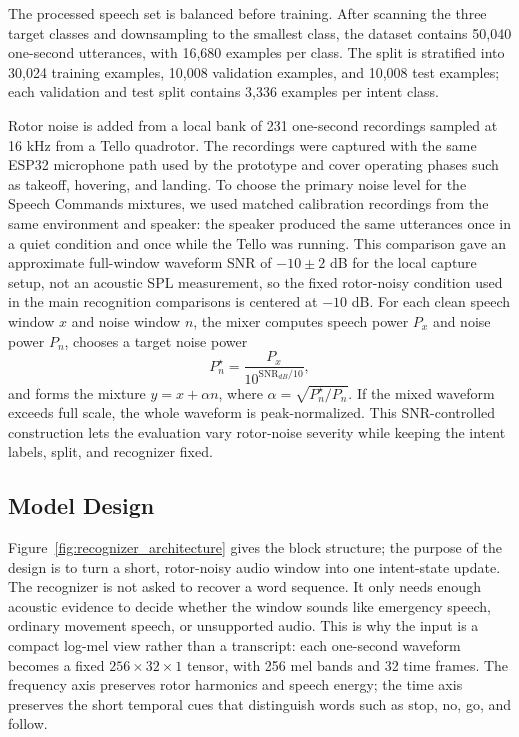 The processed speech set is balanced before training. After scanning the three target classes and downsampling to the smallest class, the dataset contains 50,040 one-second utterances, with 16,680 examples per class. The split is stratified into 30,024 training examples, 10,008 validation examples, and 10,008 test examples; each validation and test split contains 3,336 examples per intent class.

Rotor noise is added from a local bank of 231 one-second recordings sampled at 16 kHz from a Tello quadrotor. The recordings were captured with the same ESP32 microphone path used by the prototype and cover operating phases such as takeoff, hovering, and landing. To choose the primary noise level for the Speech Commands mixtures, we used matched calibration recordings from the same environment and speaker: the speaker produced the same utterances once in a quiet condition and once while the Tello was running. This comparison gave an approximate full-window waveform SNR of \(-10 \pm 2\) dB for the local capture setup, not an acoustic SPL measurement, so the fixed rotor-noisy condition used in the main recognition comparisons is centered at \(-10\) dB. For each clean speech window \(x\) and noise window \(n\), the mixer computes speech power \(P_x\) and noise power \(P_n\), chooses a target noise power
\[P_n^\star = \frac{P_x}{10^{\mathrm{SNR}_{dB}/10}},\]
and forms the mixture \(y = x + \alpha n\), where \(\alpha = \sqrt{P_n^\star/P_n}\). If the mixed waveform exceeds full scale, the whole waveform is peak-normalized. This SNR-controlled construction lets the evaluation vary rotor-noise severity while keeping the intent labels, split, and recognizer fixed.

\subsection{Model Design}

Figure~\ref{fig:recognizer_architecture} gives the block structure; the purpose of the design is to turn a short, rotor-noisy audio window into one intent-state update. The recognizer is not asked to recover a word sequence. It only needs enough acoustic evidence to decide whether the window sounds like emergency speech, ordinary movement speech, or unsupported audio. This is why the input is a compact log-mel view rather than a transcript: each one-second waveform becomes a fixed \(256 \times 32 \times 1\) tensor, with 256 mel bands and 32 time frames. The frequency axis preserves rotor harmonics and speech energy; the time axis preserves the short temporal cues that distinguish words such as stop, no, go, and follow.

